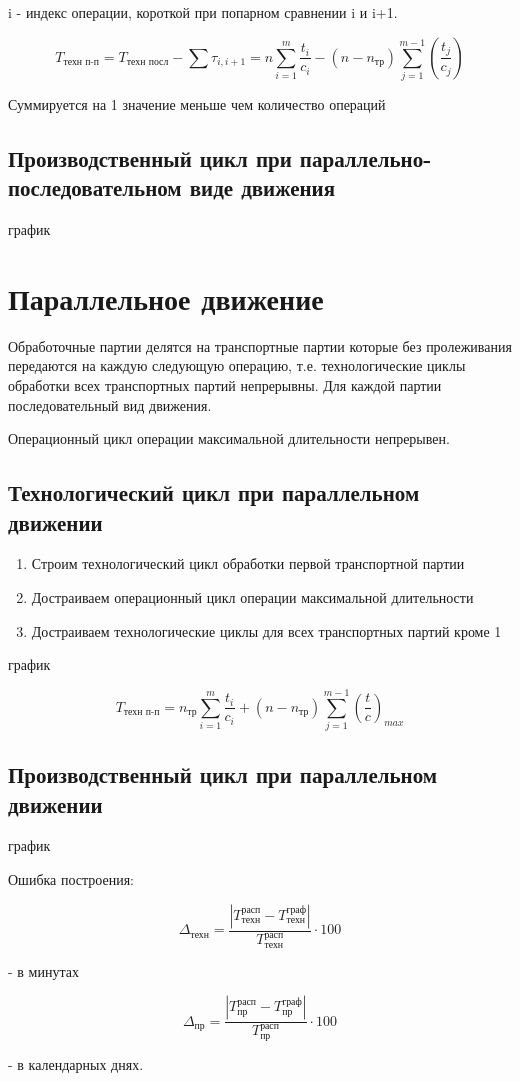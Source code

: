 \documentclass[14pt,a4paper,oneside]{extarticle}
\begin{document}
i - индекс операции, короткой при попарном сравнении i и i+1.

\[T_\text{техн п-п}=T_\text{техн посл}-\sum\tau_{i,i+1}=n\sum_{i=1}^m\frac{t_i}{c_i}-(n-n_\text{тр})\sum_{j=1}^{m-1}\left(\frac{t_j}{c_j}\right) \]

Суммируется на 1 значение меньше чем количество операций

\subsection{Производственный цикл при параллельно-последовательном виде движения}

график

\section{Параллельное движение}

Обработочные партии делятся на транспортные партии которые без пролеживания передаются на каждую следующую операцию, т.е. технологические циклы обработки всех транспортных партий непрерывны. Для каждой партии последовательный вид движения.

Операционный цикл операции максимальной длительности непрерывен.

\subsection{Технологический цикл при параллельном движении}

\begin{enumerate}
    \item Строим технологический цикл обработки первой транспортной партии
    \item Достраиваем операционный цикл операции максимальной длительности
    \item Достраиваем технологические циклы для всех транспортных партий кроме 1
\end{enumerate}

график

\[T_\text{техн п-п}=n_\text{тр}\sum_{i=1}^m\frac{t_i}{c_i}+(n-n_\text{тр})\sum_{j=1}^{m-1}\left(\frac{t}{c}\right)_{max} \]

\subsection{Производственный цикл при параллельном движении}

график

Ошибка построения:

\[\Delta_\text{техн}=\frac{\left\lvert T_\text{техн}^\text{расп}-T_\text{техн}^\text{граф}\right\rvert }{T_\text{техн}^\text{расп}}\cdot 100\]

- в минутах

\[\Delta_\text{пр}=\frac{\left\lvert T_\text{пр}^\text{расп}-T_\text{пр}^\text{граф}\right\rvert }{T_\text{пр}^\text{расп}}\cdot 100\]

- в календарных днях.
\end{document}
